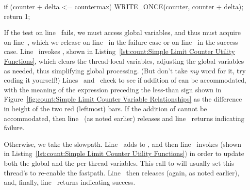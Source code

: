 \begin{listing}[tbp]
\begin{VerbatimL}[firstnumber=3]
	if (counter + delta <= countermax) {
		WRITE_ONCE(counter, counter + delta);
		return 1;
	}
\end{VerbatimL}
\caption{Intuitive Fastpath}
\label{lst:count:Intuitive Fastpath}
\end{listing}

\QuickQuizEnd

\begin{fcvref}
If the test on
line~ fails, we must access global variables, and thus
must acquire  on
line~, which we release on line~
in the failure case or on line~ in the success case.
Line~ invokes , shown in
Listing~\ref{lst:count:Simple Limit Counter Utility Functions},
which clears the thread-local variables, adjusting the global variables
as needed, thus simplifying global processing.
(But don't take \emph{my} word for it, try coding it yourself!)
Lines~ and~ check to see
if addition of  can be accommodated,
with the meaning of the expression preceding the less-than sign shown in
Figure~\ref{fig:count:Simple Limit Counter Variable Relationships}
as the difference in height of the two red (leftmost) bars.
If the addition of  cannot be accommodated, then
line~ (as noted earlier) releases  and
line~
returns indicating failure.

Otherwise, we take the slowpath.
Line~ adds  to , and then
line~ invokes  (shown in
Listing~\ref{lst:count:Simple Limit Counter Utility Functions})
in order to update both the global and the per-thread variables.
This call to 
will usually set this thread's  to re-enable the fastpath.
Line~ then releases
 (again, as noted earlier), and, finally,
line~ returns indicating success.
\end{fcvref}

